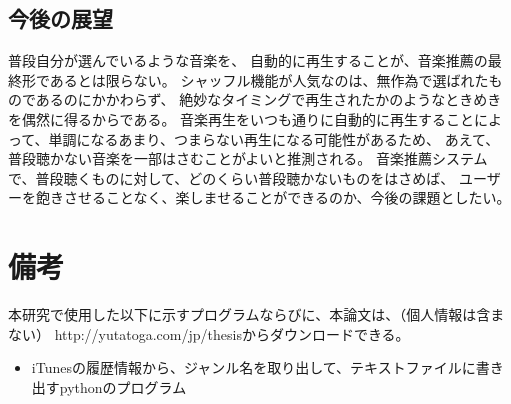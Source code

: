 \documentclass[11pt, onecolumn]{jsarticle}
\begin{document}
\subsection{今後の展望}
普段自分が選んでいるような音楽を、
自動的に再生することが、音楽推薦の最終形であるとは限らない。
シャッフル機能が人気なのは、無作為で選ばれたものであるのにかかわらず、
絶妙なタイミングで再生されたかのようなときめきを偶然に得るからである。
音楽再生をいつも通りに自動的に再生することによって、単調になるあまり、つまらない再生になる可能性があるため、
あえて、普段聴かない音楽を一部はさむことがよいと推測される。
音楽推薦システムで、普段聴くものに対して、どのくらい普段聴かないものをはさめば、
ユーザーを飽きさせることなく、楽しませることができるのか、今後の課題としたい。

\section{備考}
本研究で使用した以下に示すプログラムならびに、本論文は、（個人情報は含まない）
http://yutatoga.com/jp/thesisからダウンロードできる。
\begin{itemize}
\item
iTunesの履歴情報から、ジャンル名を取り出して、テキストファイルに書き出すpythonのプログラム

\end{itemize}
\end{document}
